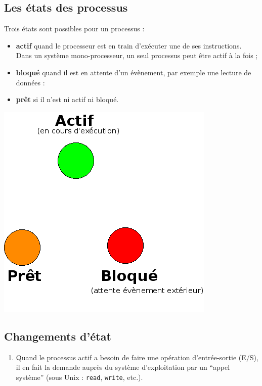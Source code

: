 \begin{multicols}{2}
\subsection{Les états des processus}

Trois états sont possibles pour un processus :

\begin{itemize}
\item \textbf{actif} quand le processeur est en train d'exécuter une
  de ses instructions. Dans un système mono-processeur, un seul processus peut être actif à la fois ;
\item \textbf{bloqué} quand il est en attente d'un évènement, par
  exemple une lecture de données : 
\item \textbf{prêt} si il n'est ni actif ni bloqué.
\end{itemize}


\begin{center}
\includegraphics[width=0.7\linewidth]{Figures/actif-pret-bloque.png}
\end{center}



\subsection{Changements d'état}
\begin{enumerate}
\item
Quand le processus actif a besoin de faire une opération
d'entrée-sortie (E/S), il en fait la demande auprès du système
d'exploitation par un ``appel système'' (sous Unix : \texttt{read},
\texttt{write}, etc.).


\end{enumerate}
\end{multicols}
